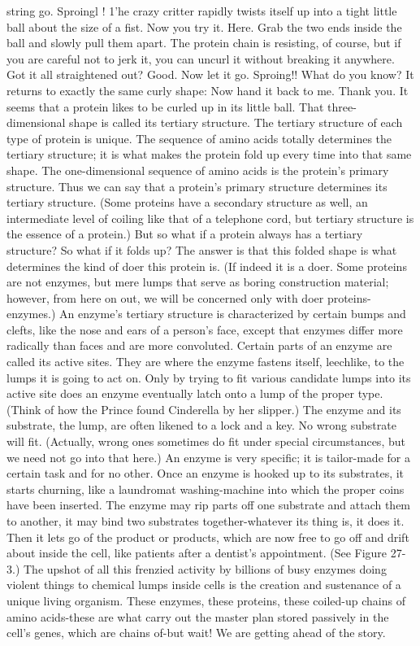 string go. Sproingl ! 1'he crazy critter rapidly twists itself up into a tight little ball
about the size of a fist. Now you try it. Here. Grab the two ends inside the ball and
slowly pull them apart. The protein chain is resisting, of course, but if you are careful
not to jerk it, you can uncurl it without breaking it anywhere. Got it all straightened
out? Good. Now let it go. Sproing!! What do you know? It returns to exactly the same
curly shape: Now hand it back to me. Thank you.
         It seems that a protein likes to be curled up in its little ball. That three-
dimensional shape is called its tertiary structure. The tertiary structure of each type of
protein is unique. The sequence of amino acids totally determines the tertiary
structure; it is what makes the protein fold up every time into that same shape. The
one-dimensional sequence of amino acids is the protein's primary structure. Thus we
can say that a protein's primary structure determines its tertiary structure. (Some
proteins have a secondary structure as well, an intermediate level of coiling like that
of a telephone cord, but tertiary structure is the essence of a protein.)
         But so what if a protein always has a tertiary structure? So what if it folds up?
The answer is that this folded shape is what determines the kind of doer this protein
is. (If indeed it is a doer. Some proteins are not enzymes, but mere lumps that serve as
boring construction material; however, from here on out, we will be concerned only
with doer proteins-enzymes.) An enzyme's tertiary structure is characterized by
certain bumps and clefts, like the nose and ears of a person's face, except that
enzymes differ more radically than faces and are more convoluted. Certain parts of an
enzyme are called its active sites. They are where the enzyme fastens itself, leechlike,
to the lumps it is going to act on. Only by trying to fit various candidate lumps into its
active site does an enzyme eventually latch onto a lump of the proper type. (Think of
how the Prince found Cinderella by her slipper.) The enzyme and its substrate, the
lump, are often likened to a lock and a key. No wrong substrate will fit. (Actually,
wrong ones sometimes do fit under special circumstances, but we need not go into
that here.)
         An enzyme is very specific; it is tailor-made for a certain task and for no other.
Once an enzyme is hooked up to its substrates, it starts churning, like a laundromat
washing-machine into which the proper coins have been inserted. The enzyme may
rip parts off one substrate and attach them to another, it may bind two substrates
together-whatever its thing is, it does it. Then it lets go of the product or products,
which are now free to go off and drift about inside the cell, like patients after a
dentist's appointment. (See Figure 27-3.)
         The upshot of all this frenzied activity by billions of busy enzymes doing
violent things to chemical lumps inside cells is the creation and sustenance of a
unique living organism. These enzymes, these proteins, these coiled-up chains of
amino acids-these are what carry out the master plan stored passively in the cell's
genes, which are chains of-but wait! We are getting ahead of the story.




